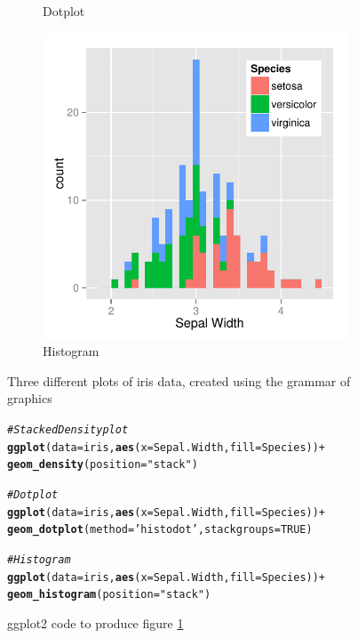 \documentclass[11pt]{isuthesis}\usepackage[]{graphicx}\usepackage[]{color}
\makeatletter
\newcommand{\hlnum}[1]{\textcolor[rgb]{0.686,0.059,0.569}{#1}}%
\newcommand{\hlstr}[1]{\textcolor[rgb]{0.192,0.494,0.8}{#1}}%
\newcommand{\hlcom}[1]{\textcolor[rgb]{0.678,0.584,0.686}{\textit{#1}}}%
\newcommand{\hlopt}[1]{\textcolor[rgb]{0,0,0}{#1}}%
\newcommand{\hlstd}[1]{\textcolor[rgb]{0.345,0.345,0.345}{#1}}%
\newcommand{\hlkwc}[1]{\textcolor[rgb]{0.333,0.667,0.333}{#1}}%
\newcommand{\hlkwd}[1]{\textcolor[rgb]{0.737,0.353,0.396}{\textbf{#1}}}%
\newenvironment{kframe}{%
 \def\at@end@of@kframe{}%
 \ifinner\ifhmode%
  \def\at@end@of@kframe{\end{minipage}}%
  \begin{minipage}{\columnwidth}%
 \fi\fi%
 \def\FrameCommand##1{\hskip\@totalleftmargin \hskip-\fboxsep
 \colorbox{shadecolor}{##1}\hskip-\fboxsep
     \hskip-\linewidth \hskip-\@totalleftmargin \hskip\columnwidth}%
 \MakeFramed {\advance\hsize-\width
   \@totalleftmargin\z@ \linewidth\hsize
   \@setminipage}}%
 {\par\unskip\endMakeFramed%
 \at@end@of@kframe}
\newenvironment{knitrout}{}{} %
\makeatother
\begin{document}
\begin{figure}[htbp]
\begin{subfigure}[b]{.33\textwidth}
  \caption{Dotplot}
\end{subfigure}\hfill
\begin{subfigure}[b]{.33\textwidth}\centering
  \includegraphics[width=\textwidth]{fig-irisdatagrammar3}
  \caption{Histogram}
\end{subfigure}\hfill
\caption{Three different plots of iris data, created using the grammar of graphics}\label{fig:grammarplots}
\end{figure}

\begin{figure}[htbp]\centering
\begin{knitrout}
\color{fgcolor}\begin{kframe}
\begin{alltt}
\hlcom{# Stacked Density plot}
\hlkwd{ggplot}\hlstd{(}\hlkwc{data}\hlstd{=iris,} \hlkwd{aes}\hlstd{(}\hlkwc{x}\hlstd{=Sepal.Width,} \hlkwc{fill}\hlstd{=Species))} \hlopt{+}
  \hlkwd{geom_density}\hlstd{(}\hlkwc{position}\hlstd{=}\hlstr{"stack"}\hlstd{)}

\hlcom{# Dotplot }
\hlkwd{ggplot}\hlstd{(}\hlkwc{data}\hlstd{=iris,} \hlkwd{aes}\hlstd{(}\hlkwc{x}\hlstd{=Sepal.Width,} \hlkwc{fill}\hlstd{=Species))} \hlopt{+}
  \hlkwd{geom_dotplot}\hlstd{(}\hlkwc{method}\hlstd{=}\hlstr{'histodot'}\hlstd{,} \hlkwc{stackgroups}\hlstd{=}\hlnum{TRUE}\hlstd{)}

\hlcom{# Histogram}
\hlkwd{ggplot}\hlstd{(}\hlkwc{data}\hlstd{=iris,} \hlkwd{aes}\hlstd{(}\hlkwc{x}\hlstd{=Sepal.Width,} \hlkwc{fill}\hlstd{=Species))} \hlopt{+}
  \hlkwd{geom_histogram}\hlstd{(}\hlkwc{position}\hlstd{=}\hlstr{"stack"}\hlstd{)}
\end{alltt}
\end{kframe}
\end{knitrout}

\caption{ggplot2 code to produce figure \protect\ref{fig:grammarplots}}\label{fig:grammarcode}
\end{figure}
\end{document}
